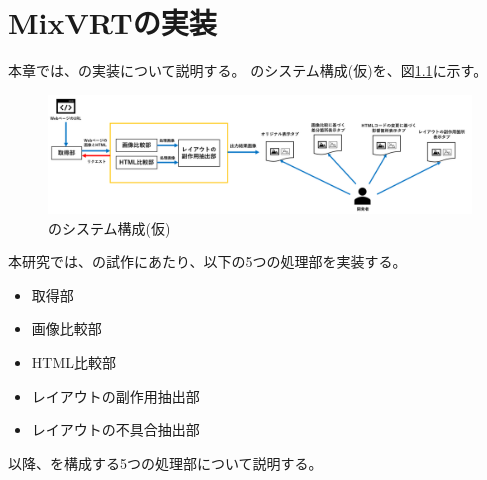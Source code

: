 \chapter{MixVRTの実装}\label{cha:Implementation}
本章では、\toolName の実装について説明する。
\toolName のシステム構成(仮)を、図\ref{fig:System}に示す。
\begin{figure}[tp]
    \begin{center}
        \includegraphics[width=1.0\columnwidth]{image/4_System.png}
        \caption{\toolName のシステム構成(仮)}
        \label{fig:System}
    \end{center}
\end{figure}
本研究では、\toolName の試作にあたり、以下の5つの処理部を実装する。
\begin{itemize}
    \item 取得部
    \item 画像比較部
    \item HTML比較部
    \item レイアウトの副作用抽出部
    \item レイアウトの不具合抽出部
\end{itemize}
以降、\toolName を構成する5つの処理部について説明する。
\par


